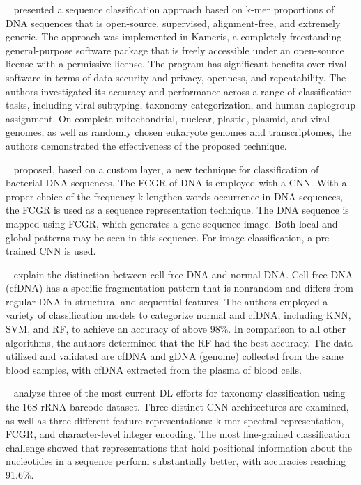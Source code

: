 \citeauthor{Solis-Reyes2018DNADatasets}~\cite{Solis-Reyes2018DNADatasets} presented a sequence classification approach based on k-mer proportions of \gls{DNA} sequences that is open-source, supervised, alignment-free, and extremely generic. The approach was implemented in Kameris, a completely freestanding general-purpose software package that is freely accessible under an open-source license with a permissive license. The program has significant benefits over rival software in terms of data security and privacy, openness, and repeatability. The authors investigated its accuracy and performance across a range of classification tasks, including viral subtyping, taxonomy categorization, and human haplogroup assignment. On complete mitochondrial, nuclear, plastid, plasmid, and viral genomes, as well as randomly chosen eukaryote genomes and transcriptomes, the authors demonstrated the effectiveness of the proposed technique.

\citeauthor{Abd-Alhalem2020BacterialLayers}~\cite{Abd-Alhalem2020BacterialLayers} proposed, based on a custom layer, a new technique for classification of bacterial \gls{DNA} sequences. The \gls{FCGR} of \gls{DNA} is employed with a \gls{CNN}. With a proper choice of the frequency k-lengthen words occurrence in \gls{DNA} sequences, the \gls{FCGR} is used as a sequence representation technique. The \gls{DNA} sequence is mapped using \gls{FCGR}, which generates a gene sequence image. Both local and global patterns may be seen in this sequence. For image classification, a pre-trained \gls{CNN} is used. 

\citeauthor{Chen2017AClassification}~\cite{Chen2017AClassification} explain the distinction between cell-free DNA and normal DNA. Cell-free DNA (cfDNA) has a specific fragmentation pattern that is nonrandom and differs from regular DNA in structural and sequential features. The authors employed a variety of classification models to categorize normal and cfDNA, including \gls{KNN}, \gls{SVM}, and \gls{RF}, to achieve an accuracy of above 98\%. In comparison to all other algorithms, the authors determined that the \gls{RF} had the best accuracy. The data utilized and validated are cfDNA and gDNA (genome) collected from the same blood samples, with cfDNA extracted from the plasma of blood cells.

\citeauthor{Helaly2019ConvolutionalStudy}~\cite{Helaly2019ConvolutionalStudy} analyze three of the most current \gls{DL} efforts for taxonomy classification using the 16S rRNA barcode dataset. Three distinct \gls{CNN} architectures are examined, as well as three different feature representations: k-mer spectral representation, \gls{FCGR}, and character-level integer encoding. The most fine-grained classification challenge showed that representations that hold positional information about the nucleotides in a sequence perform substantially better, with accuracies reaching 91.6\%.

